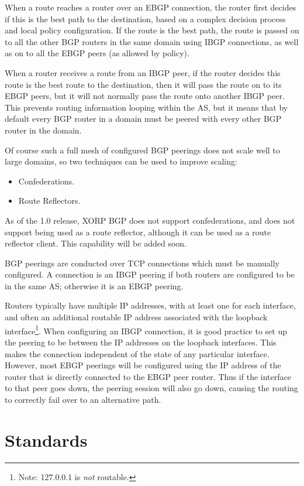 When a route reaches a router over an EBGP connection, the router
first decides if this is the best path to the destination, based on a
complex decision process and local policy configuration.  If the route
is the best path, the route is passed on to all the other BGP routers
in the same domain using IBGP connections, as well as on to all the
EBGP peers (as allowed by policy).

When a router receives a route from an IBGP peer, if the router decides
this route is the best route to the destination, then it will pass the
route on to its EBGP peers, but it will not normally pass the route
onto another IBGP peer.  This prevents routing information looping
within the AS, but it means that by default every BGP router in a
domain must be peered with every other BGP router in the domain.

Of course such a full mesh of configured BGP peerings does not scale
well to large domains, so two techniques can be used to improve
scaling:
\begin{itemize}
\item Confederations.
\item Route Reflectors.
\end{itemize}
As of the 1.0 release, XORP BGP does not support confederations, and
does not support being used as a route reflector, although it can be
used as a route reflector client.  This capability will be added soon.

BGP peerings are conducted over TCP connections which must be manually
configured.  A connection is an IBGP peering if both routers are
configured to be in the same AS; otherwise it is an EBGP peering.

Routers typically have multiple IP addresses, with at least one for
each interface, and often an additional routable IP address associated
with the loopback interface\footnote{Note: 127.0.0.1 is {\it not} routable.}.
When configuring an IBGP connection, it is good practice to set up the
peering to be between the IP addresses on the loopback interfaces.
This makes the connection independent of the state of any particular
interface.  However, most EBGP peerings will be configured using the
IP address of the router that is directly connected to the EBGP peer
router.  Thus if the interface to that peer goes down, the peering
session will also go down, causing the routing to correctly fail over
to an alternative path.

\section{Standards}

